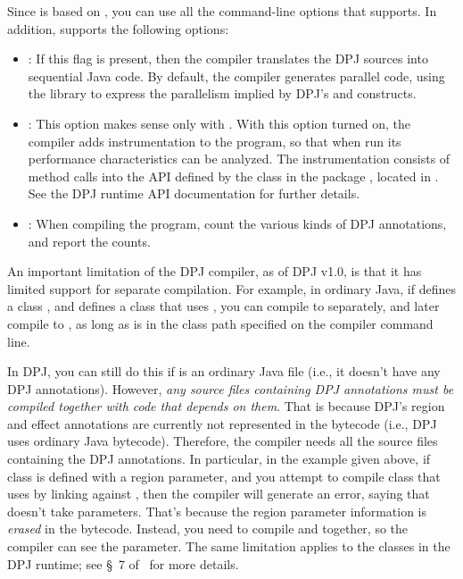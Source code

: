 Since  is based on , you can use all the
command-line options that  supports.  In addition,
 supports the following options:
%
\begin{itemize}
%
\item {}: If this flag is present, then the compiler
  translates the DPJ sources into sequential Java code.  By default,
  the compiler generates parallel code, using the 
  library to express the parallelism implied by DPJ's 
  and  constructs.
%
\item {}: This option makes sense only with .
  With this option turned on, the compiler adds instrumentation to the
  program, so that when run its performance characteristics can be
  analyzed.  The instrumentation consists of method calls into the API
  defined by the  class in the package
  , located in .  See the
  DPJ runtime API documentation for further details.
%
\item {}: When compiling the program, count the various
  kinds of DPJ annotations, and report the counts.
%
\end{itemize}

An important limitation of the DPJ compiler, as of DPJ v1.0, is that
it has limited support for separate compilation.  For example, in
ordinary Java, if  defines a class , and
 defines a class  that uses , you can
compile  to  separately, and later
compile  to , as long as 
is in the class path specified on the compiler command line.

In DPJ, you can still do this if  is an ordinary Java
file (i.e., it doesn't have any DPJ annotations).  However, \emph{any
  source files containing DPJ annotations must be compiled together
  with code that depends on them}.  That is because DPJ's region and
effect annotations are currently not represented in the bytecode
(i.e., DPJ uses ordinary Java bytecode).  Therefore, the compiler
needs all the source files containing the DPJ annotations.  In
particular, in the example given above, if class  is defined
with a region parameter, and you attempt to compile class 
that uses  by linking against , then the
compiler will generate an error, saying that  doesn't take
parameters.  That's because the region parameter information is
\emph{erased} in the  bytecode.  Instead, you need to
compile  and  together, so the compiler
can see the parameter.  The same limitation applies to the classes in
the DPJ runtime; see \S~7 of \ for more details.

